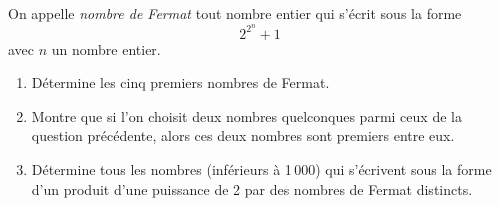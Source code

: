 
On appelle {\em nombre de Fermat} tout nombre entier qui s'écrit
  sous la forme
\[2^{2^n}+1\]
avec $n$ un nombre entier. 
\begin{enumerate}
  \item Détermine les cinq premiers nombres de Fermat. 
\item Montre que  si l'on choisit deux nombres  quelconques parmi ceux
  de  la question  précédente, alors  ces deux  nombres  sont premiers
  entre eux. 
\item Détermine tous les  nombres (inférieurs à 1\,000) qui s'écrivent
  sous la forme  d'un produit d'une puissance de 2  par des nombres de
  Fermat distincts.
\end{enumerate}
